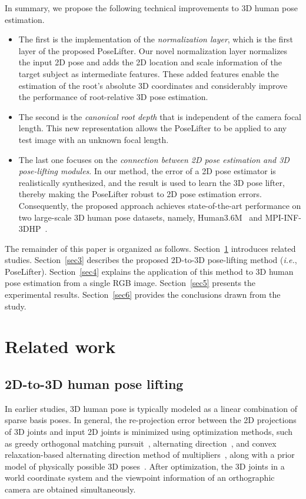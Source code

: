 \documentclass[10pt,twocolumn,letterpaper]{article}
\begin{document}
In summary, we propose the following technical improvements to 3D human pose estimation.
\begin{itemize}
  \item The first is the implementation of the \textit{normalization layer}, which is the first layer of the proposed PoseLifter. Our novel normalization layer normalizes the input 2D pose and adds the 2D location and scale information of the target subject as intermediate features. These added features enable the estimation of the root's absolute 3D coordinates and considerably improve the performance of root-relative 3D pose estimation.
  \item The second is the \textit{canonical root depth} that is independent of the camera focal length. This new representation allows the PoseLifter to be applied to any test image with an unknown focal length.
  \item The last one focuses on the \textit{connection between 2D pose estimation and 3D pose-lifting modules}. In our method, the error of a 2D pose estimator is realistically synthesized, and the result is used to learn the 3D pose lifter, thereby making the PoseLifter robust to 2D pose estimation errors. Consequently, the proposed approach achieves state-of-the-art performance on two large-scale 3D human pose datasets, namely, Human3.6M~\cite{Ionescu2014} and MPI-INF-3DHP~\cite{Mehta2017}.
\end{itemize}

The remainder of this paper is organized as follows. Section~\ref{sec2} introduces related studies. Section~\ref{sec3} describes the proposed 2D-to-3D pose-lifting method (\textit{i.e.}, PoseLifter). Section~\ref{sec4} explains the application of this method to 3D human pose estimation from a single RGB image. Section~\ref{sec5} presents the experimental results. Section~\ref{sec6} provides the conclusions drawn from the study.

\section{Related work}
\label{sec2}

\subsection{2D-to-3D human pose lifting}

In earlier studies, 3D human pose is typically modeled as a linear combination of sparse basis poses. In general, the re-projection error between the 2D projections of 3D joints and input 2D joints is minimized using optimization methods, such as greedy orthogonal matching pursuit~\cite{Ramakrishna2012}, alternating direction~\cite{Wang2014}, and convex relaxation-based alternating direction method of multipliers~\cite{Zhou2015}, along with a prior model of physically possible 3D poses~\cite{Akhter2015}. After optimization, the 3D joints in a world coordinate system and the viewpoint information of an orthographic camera are obtained simultaneously.
\end{document}
